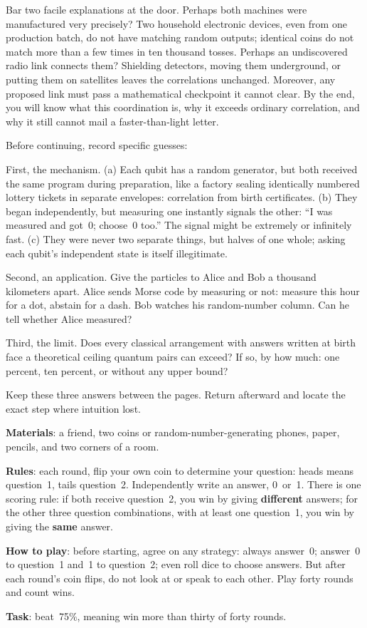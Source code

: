 Bar two facile explanations at the door. Perhaps both machines were manufactured very precisely? Two household electronic devices, even from one production batch, do not have matching random outputs; identical coins do not match more than a few times in ten thousand tosses. Perhaps an undiscovered radio link connects them? Shielding detectors, moving them underground, or putting them on satellites leaves the correlations unchanged. Moreover, any proposed link must pass a mathematical checkpoint it cannot clear. By the end, you will know what this coordination is, why it exceeds ordinary correlation, and why it still cannot mail a faster-than-light letter.


Before continuing, record specific guesses:

First, the mechanism. (a) Each qubit has a random generator, but both received the same program during preparation, like a factory sealing identically numbered lottery tickets in separate envelopes: correlation from birth certificates. (b) They began independently, but measuring one instantly signals the other: ``I was measured and got~0; choose~0 too.'' The signal might be extremely or infinitely fast. (c) They were never two separate things, but halves of one whole; asking each qubit's independent state is itself illegitimate.

Second, an application. Give the particles to Alice and Bob a thousand kilometers apart. Alice sends Morse code by measuring or not: measure this hour for a dot, abstain for a dash. Bob watches his random-number column. Can he tell whether Alice measured?

Third, the limit. Does every classical arrangement with answers written at birth face a theoretical ceiling quantum pairs can exceed? If so, by how much: one percent, ten percent, or without any upper bound?

Keep these three answers between the pages. Return afterward and locate the exact step where intuition lost.


\begin{experiment}
\textbf{Materials}: a friend, two coins or random-number-generating phones, paper, pencils, and two corners of a room.

\textbf{Rules}: each round, flip your own coin to determine your question: heads means question~1, tails question~2. Independently write an answer, 0~or~1. There is one scoring rule: if both receive question~2, you win by giving \textbf{different} answers; for the other three question combinations, with at least one question~1, you win by giving the \textbf{same} answer.

\textbf{How to play}: before starting, agree on any strategy: always answer~0; answer~0 to question~1 and~1 to question~2; even roll dice to choose answers. But after each round's coin flips, do not look at or speak to each other. Play forty rounds and count wins.

\textbf{Task}: beat~75\%, meaning win more than thirty of forty rounds.
\end{experiment}

